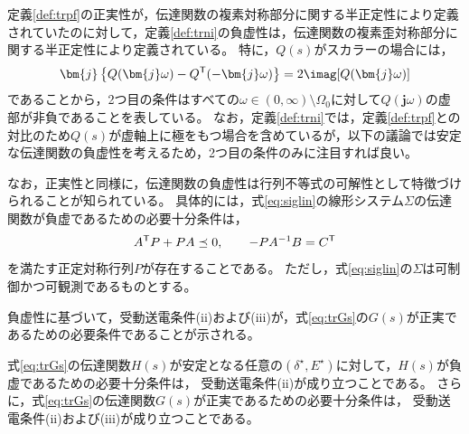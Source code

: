 \documentclass[tombow,dvipdfmx]{corona-a5-1.1}
\begin{document}
定義\ref{def:trpf}の正実性が，伝達関数の複素対称部分に関する半正定性により定義されていたのに対して，定義\ref{def:trni}の負虚性は，伝達関数の複素歪対称部分に関する半正定性により定義されている。
特に，$Q(s)$がスカラーの場合には，
\begin{align*}
\bm{j}\left\{Q(\bm{j} \omega) - Q^{\sf T}(-\bm{j} \omega) \right\}
= 2 \imag[Q(\bm{j} \omega)]
\end{align*}
であることから，2つ目の条件はすべての$\omega \in (0,\infty)\setminus \Omega_0$に対して$Q(\bm{j}\omega)$の虚部が非負であることを表している。
なお，定義\ref{def:trni}では，定義\ref{def:trpf}との対比のため$Q(s)$が虚軸上に極をもつ場合を含めているが，以下の議論では安定な伝達関数の負虚性を考えるため，2つ目の条件のみに注目すれば良い。


なお，正実性と同様に，伝達関数の負虚性は行列不等式の可解性として特徴づけられることが知られている。
具体的には，式\ref{eq:siglin}の線形システム$\Sigma$の伝達関数が負虚であるための必要十分条件は，
\[
A^{\sf T} P  + PA \preceq 0 ,\qquad -PA^{-1}B = C^{\sf T}
\]
を満たす正定対称行列$P$が存在することである。
ただし，式\ref{eq:siglin}の$\Sigma$は可制御かつ可観測であるものとする。





負虚性に基づいて，受動送電条件(ii)および(iii)が，式\ref{eq:trGs}の$G(s)$が正実であるための必要条件であることが示される。

\begin{定理}[電気サブシステムの伝達関数の正実性]
\label{thm:EdynNI}
式\ref{eq:trGs}の伝達関数$H(s)$が安定となる任意の$(\delta^{\star},E^{\star})$に対して，$H(s)$が負虚であるための必要十分条件は，
受動送電条件(ii)が成り立つことである。
さらに，式\ref{eq:trGs}の伝達関数$G(s)$が正実であるための必要十分条件は，
受動送電条件(ii)および(iii)が成り立つことである。
\end{定理}
\end{document}
